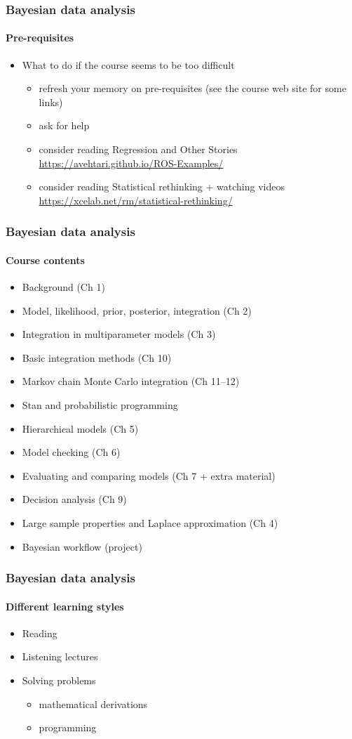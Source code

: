 \documentclass[english,t]{beamer}
\begin{document}
\begin{frame}
  \frametitle{Bayesian data analysis}  %
  \framesubtitle{Pre-requisites}
  \begin{itemize}
  \item What to do if the course seems to be too difficult
    \begin{itemize}
    \item refresh your memory on pre-requisites (see the course web
      site for some links)
    \item ask for help
    \item consider reading Regression and Other Stories \url{https://avehtari.github.io/ROS-Examples/}
    \item consider reading Statistical rethinking + watching videos \url{https://xcelab.net/rm/statistical-rethinking/}
    \end{itemize}
  \end{itemize}

\end{frame}

\begin{frame}
  \frametitle{Bayesian data analysis}  %
  \framesubtitle{Course contents}
  \begin{itemize}
  \item Background (Ch 1)
  \item Model, likelihood, prior, posterior, integration (Ch 2)
  \item Integration in multiparameter models (Ch 3)
  \item Basic integration methods (Ch 10)
  \item Markov chain Monte Carlo integration (Ch 11--12)
  \item Stan and probabilistic programming
  \item Hierarchical models (Ch 5)
  \item Model checking (Ch 6)
  \item Evaluating and comparing models (Ch 7 + extra material)
  \item Decision analysis (Ch 9)
  \item Large sample properties and Laplace approximation (Ch 4)
  \item Bayesian workflow (project)
  \end{itemize}
  
\end{frame}


\begin{frame}
  \frametitle{Bayesian data analysis}  %
  \framesubtitle{Different learning styles}

  \begin{itemize}
  \item Reading
  \item Listening lectures
  \item Solving problems
    \begin{itemize}
    \item mathematical derivations
    \item programming
    \end{itemize}
  \end{itemize}
  
\end{frame}
\end{document}
